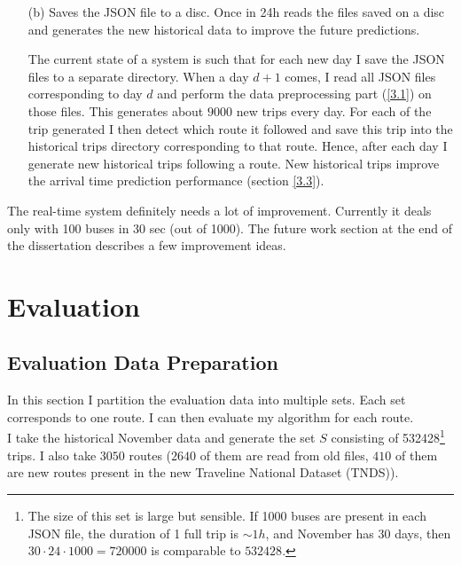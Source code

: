 \documentclass[12pt,a4paper,oneside,openright]{report}
\begin{document}
\begin{enumerate}
\begin{itemize}
\end{itemize}



\item[(b)] Saves the JSON file to a disc. Once in 24h reads the files saved on a disc
and generates the new historical data to improve the future predictions.

The current state of a system is such that for each new day I save the JSON files
to a separate directory. When a day $d+1$ comes, I read all JSON files corresponding
to day $d$ and perform the data preprocessing part (\textcolor{blue}{\ref{3.1}}) on those files. This generates
about $9000$ new trips every day. For each of the trip generated I then detect
which route it followed and save this trip into the historical trips directory
corresponding to that route. Hence, after each day I generate new historical trips
following a route. New historical trips improve the arrival time prediction
performance (section \textcolor{blue}{\ref{3.3}}).

\end{enumerate}

The real-time system definitely needs a lot of improvement. Currently it deals only with 100 buses
in 30 sec (out of 1000). The future work section at the end of the dissertation describes a few
improvement ideas.

\chapter{Evaluation}

\section{Evaluation Data Preparation}

\label{4.1}

In this section I partition the evaluation data into multiple sets. Each set corresponds to one route. I can then evaluate
my algorithm for each route. \\

I take the historical November data and generate the set $S$ consisting of 532428\footnote{
The size of this set is large but sensible. If 1000 buses are present in each JSON file,
the duration of 1 full trip is $\sim1h$, and November has 30 days, 
then $30 \cdot 24 \cdot 1000 = 720000$ is comparable to $532428$.} trips. I also take $3050$ routes
($2640$ of them are read from old files, $410$ of them are new routes present
in the new Traveline National Dataset (TNDS)). \\
\end{document}
